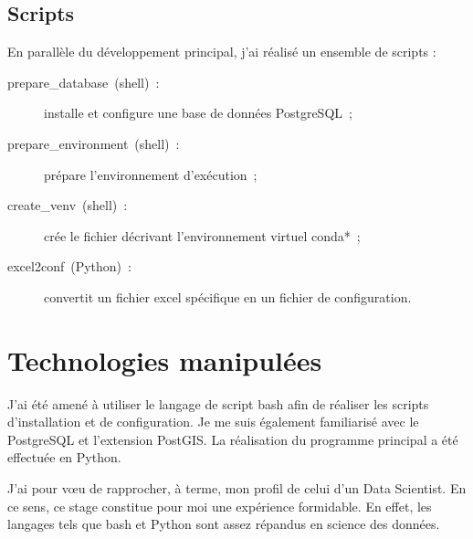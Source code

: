   \subsection*{Scripts}

En parallèle du développement principal, j'ai réalisé un ensemble de scripts :

\begin{description}
\item[prepare\_database~(shell)~:] installe et configure une base de données PostgreSQL~;
\item[prepare\_environment~(shell)~:] prépare l'environnement d'exécution~;
\item[create\_venv~(shell)~:] crée le fichier décrivant l'environnement virtuel \gls{conda}*~;
\item[excel2conf~(Python)~:] convertit un fichier excel spécifique en un fichier  de configuration.
\end{description}

\section*{Technologies manipulées}

J'ai été amené à utiliser le langage de script bash afin de réaliser les scripts d'installation et de configuration. Je me suis également familiarisé avec le  PostgreSQL et l'extension PostGIS. La réalisation du programme principal a été effectuée en Python.

J'ai pour vœu de rapprocher, à terme, mon profil de celui d'un Data Scientist. En ce sens, ce stage constitue pour moi une expérience formidable. En effet, les langages tels que bash et Python sont assez répandus en science des données.
